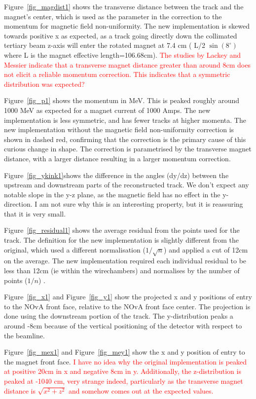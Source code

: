 Figure~\ref{fig_magdist1} shows the transverse distance between the track and the magnet's center, which is used as the parameter in the correction to the momentum for magnetic field non-uniformity. The new implementation is skewed towards positive x as expected, as a track going directly down the collimated tertiary beam z-axis will enter the rotated magnet at 7.4 cm ( L/2 $\sin(8^{\circ})$ where L is the magnet effective length=106.68cm).   \textcolor{red}{The studies by Lackey and Messier indicate that a transverse magnet distance greater than around 8cm does not elicit a reliable momentum correction. This indicates that a symmetric distribution was expected?}
  
Figure~\ref{fig_p1} shows the momentum in MeV. This is peaked roughly around 1000 MeV as expected for a magnet current of 1000 Amps. The new implementation is less symmetric, and has fewer tracks at higher momenta. The new implementation without the magnetic field non-uniformity correction is shown in dashed red, confirming that the correction is the primary cause of this curious change in shape. The correction is parametrised by the transverse magnet distance, with a larger distance resulting in a larger momentum correction.
  
Figure~\ref{fig_ykink1}shows the difference in the angles (dy/dz) between the upstream and downstream parts of the reconstructed track. We don't expect any notable slope in the y-z plane, as the magnetic field has no effect in the y-direction. I am not sure why this is an interesting property, but it is reassuring that it is very small.

Figure~\ref{fig_residual1} shows the average residual from the points used for the track. The definition for the new implementation is slightly different from the original, which used a different normalisation ($1/ \sqrt{n}$) and applied a cut of 12cm on the average. The new implementation required each individual residual to be less than 12cm (ie within the wirechambers) and normalises by the number of points ($1/ n$) .

Figure~\ref{fig_x1} and Figure~\ref{fig_y1} show the projected x and y positions of entry to the NOvA front face, relative to the NOvA front face center. The projection is done using the downstream portion of the track. The y-distribution peaks a around -8cm because of the vertical positioning of the detector with respect to the beamline.

Figure~\ref{fig_mex1} and Figure~\ref{fig_mey1} show the x and y position of entry to the magnet front face. \textcolor{red}{I have no idea why the original implementation is peaked at positive 20cm in x and negative 8cm in y. Additionally, the z-distribution is peaked at -1040 cm, very strange indeed, particularly as the transverse magnet distance is $\sqrt{x^2 +z^2}$ and somehow comes out at the expected values.}

